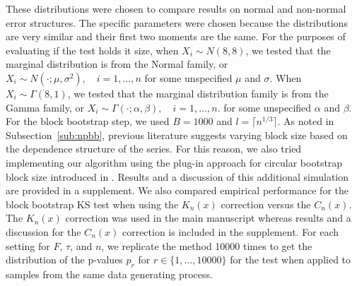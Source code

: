 \documentclass[12pt]{article}
\begin{document}
These distributions
were chosen to compare results on normal and non-normal
error structures. The specific parameters were chosen because the distributions
are very similar and their first two moments are the same. For the purposes of
evaluating if the test holds it size, when $X_i \sim N(8, 8)$, we tested that the
marginal distribution is from the
Normal family, or
$X_i \sim N(\cdot ; \mu, \sigma^2), \quad i = 1, \ldots, n$
for some unspecified $\mu$ and $\sigma$. When $X_i \sim \Gamma(8, 1)$, we tested
that the marginal distribution family is from the Gamma family,
or
$X_i \sim \Gamma(\cdot ; \alpha, \beta), \quad i = 1, \ldots, n$.
for some unspecified $\alpha$ and $\beta$. For the block bootstrap step,
we used $B = 1000$ and $l = \lceil n^{1/3} \rceil$.
As noted in Subsection~\ref{sub:npbb}, previous literature
suggests varying block size based on the dependence structure of the series.
For this reason,
we also tried implementing our algorithm using the plug-in approach for circular
bootstrap block size introduced in \citet{politis2004automatic}. Results and
a discussion of this additional simulation are provided in a supplement.
We also compared empirical performance for the block bootstrap KS test when using the $K_n(x)$ correction
versus the $C_n(x)$. The $K_n(x)$ correction was used
in the main manuscript whereas results and a discussion for the
$C_n(x)$ correction is included in the supplement.
For each setting for $F$, $\tau$, and $n$, we replicate the method 10000 times
to get the distribution of the p-values $p_r$ for
$r \in \{1, \dots, 10000\}$
for the test when applied to samples from the same data generating process.
\end{document}
